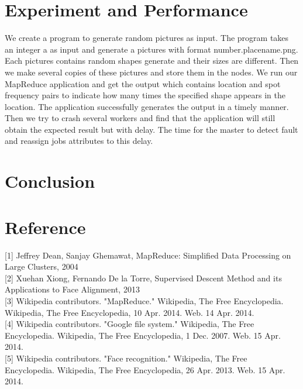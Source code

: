 \documentclass[12pt]{article}
\begin{document}
\section{Experiment and Performance }

We create a program to generate random pictures as input. The program takes an integer a as input and generate a pictures with format number.placename.png.  Each pictures contains random shapes generate and their sizes are different. Then we make several copies of these pictures and store them in the nodes. We run our MapReduce application and get the output which contains location and spot frequency pairs to indicate how many times the specified shape appears in the location. The application successfully generates the output in a timely manner. Then we try to crash several workers and find that the application will still obtain the expected result but with delay. The time for the master to detect fault and reassign jobs attributes to this delay.
  
\section {Conclusion}

\section*{Reference}

[1] Jeffrey Dean, Sanjay Ghemawat, MapReduce: Simplified Data Processing on Large Clusters, 2004 \\
{[2]} Xuehan Xiong, Fernando De la Torre, Supervised Descent Method and its Applications to Face Alignment, 2013\\
{[3]} Wikipedia contributors. "MapReduce." Wikipedia, The Free Encyclopedia. Wikipedia, The Free Encyclopedia, 10 Apr. 2014. Web. 14 Apr. 2014. \\
{[4]} Wikipedia contributors. "Google file system." Wikipedia, The Free Encyclopedia. Wikipedia, The Free Encyclopedia, 1 Dec. 2007. Web. 15 Apr. 2014. \\
{[5]} Wikipedia contributors. "Face recognition." Wikipedia, The Free Encyclopedia. Wikipedia, The Free Encyclopedia, 26 Apr. 2013. Web. 15 Apr. 2014.
\end{document}
